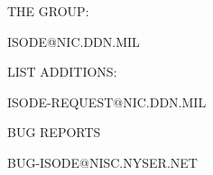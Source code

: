 \begin{bwslide}

\begin{nrtc}
\item	THE GROUP:
    \begin{nrtc}
    \item	ISODE@NIC.DDN.MIL
    \end{nrtc}

\item	LIST ADDITIONS:
    \begin{nrtc}
    \item	ISODE-REQUEST@NIC.DDN.MIL
    \end{nrtc}

\item	BUG REPORTS
    \begin{nrtc}
    \item	BUG-ISODE@NISC.NYSER.NET
    \end{nrtc}
\end{nrtc}
\end{bwslide}
